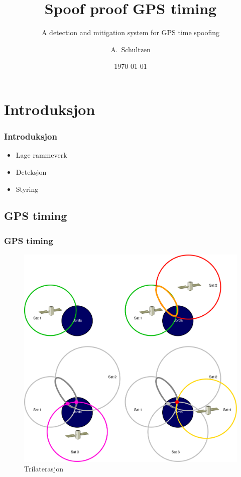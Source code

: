 \documentclass[xcolor=table]{beamer}
\title[Spoof proof GPS timing] %
{Spoof proof GPS timing}
\subtitle{A detection and mitigation system for GPS time spoofing}
\author[A. Schultzen] %
{A.~Schultzen\inst{1}}
\institute[Universities Here and There] %
{
  \inst{1}%
  Institutt for informatikk\\
  Universitetet i Oslo
}
\date{\today}
\begin{document}
\frame{\titlepage}

\section{Introduksjon}
\begin{frame}
  \frametitle{Introduksjon}
  \begin{itemize}
    \setlength\itemsep{2em}
    \item Lage rammeverk
    \item Deteksjon
    \item Styring
\end{itemize}
\end{frame}

\subsection{GPS timing}
\begin{frame}
\frametitle{GPS timing} 
  \begin{figure}
  \vspace{-30pt}
      \includegraphics[scale=0.17]{thesis/graphics/trilaterate.pdf}
      \caption{Trilaterasjon}
    \end{figure}
\end{frame}
\end{document}
